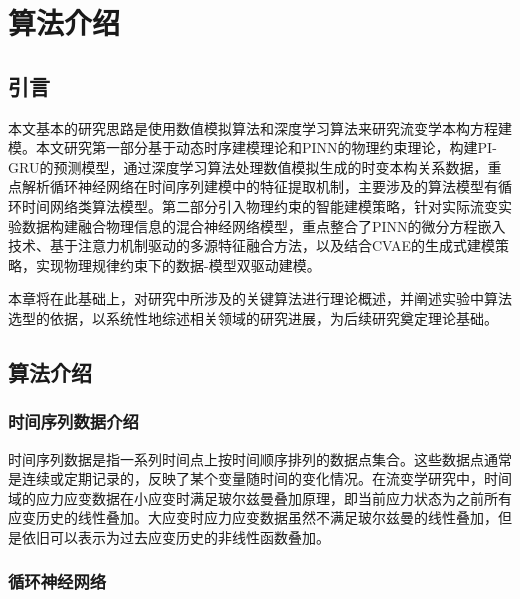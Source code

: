 \chapter{算法介绍}
\section{引言}
本文基本的研究思路是使用数值模拟算法和深度学习算法来研究流变学本构方程建模。本文研究第一部分基于动态时序建模理论和PINN的物理约束理论，构建PI-GRU的预测模型，通过深度学习算法处理数值模拟生成的时变本构关系数据，重点解析循环神经网络在时间序列建模中的特征提取机制，主要涉及的算法模型有循环时间网络类算法模型。第二部分引入物理约束的智能建模策略，针对实际流变实验数据构建融合物理信息的混合神经网络模型，重点整合了PINN的微分方程嵌入技术、基于注意力机制驱动的多源特征融合方法，以及结合CVAE的生成式建模策略，实现物理规律约束下的数据-模型双驱动建模。

本章将在此基础上，对研究中所涉及的关键算法进行理论概述，并阐述实验中算法选型的依据，以系统性地综述相关领域的研究进展，为后续研究奠定理论基础。
\section{算法介绍}
\subsection{时间序列数据介绍}
时间序列数据是指一系列时间点上按时间顺序排列的数据点集合。这些数据点通常是连续或定期记录的，反映了某个变量随时间的变化情况。在流变学研究中，时间域的应力应变数据在小应变时满足玻尔兹曼叠加原理，即当前应力状态为之前所有应变历史的线性叠加\cite{boltzmannZurTheorieElastischen1878}。大应变时应力应变数据虽然不满足玻尔兹曼的线性叠加，但是依旧可以表示为过去应变历史的非线性函数叠加。

\subsection{循环神经网络}
